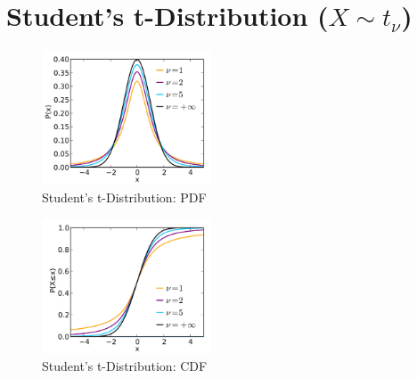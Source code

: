 \chapter{Student's t-Distribution ($X \sim t_\nu$) \cite{ism-1,wiki/Student_t-distribution}}\label{Student's t-Distribution}

\begin{table}[H]
    \begin{minipage}{0.49\linewidth}
        \begin{figure}[H]
            \centering
            \includegraphics[width=\linewidth, height=4cm, keepaspectratio]{Pictures/distributions/Student_t_pdf.jpg}
            \caption{Student's t-Distribution: PDF}
        \end{figure}
    \end{minipage}
    \hfill
    \begin{minipage}{0.49\linewidth}
        \begin{figure}[H]
            \centering
            \includegraphics[width=\linewidth, height=4cm, keepaspectratio]{Pictures/distributions/Student_t_cdf.jpg}
            \caption{Student's t-Distribution: CDF}
        \end{figure}
    \end{minipage}
\end{table}

